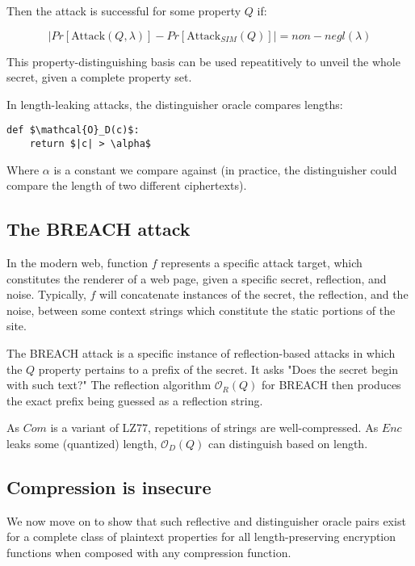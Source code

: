 \documentclass{article}
\begin{document}
Then the attack is successful for some property $Q$ if:

\begin{equation*}
    |Pr[\text{Attack}(Q, \lambda)] - Pr[\text{Attack}_{SIM}(Q)]| = non-negl(\lambda)
\end{equation*}

This property-distinguishing basis can be used repeatitively to unveil the
whole secret, given a complete property set.

In length-leaking attacks, the distinguisher oracle compares lengths:

\begin{lstlisting}[texcl,mathescape]
def $\mathcal{O}_D(c)$:
    return $|c| > \alpha$
\end{lstlisting}

Where $\alpha$ is a constant we compare against (in practice, the distinguisher
could compare the length of two different ciphertexts).

\subsection*{The BREACH attack}

In the modern web, function $f$ represents a specific attack target, which
constitutes the renderer of a web page, given a specific secret, reflection,
and noise. Typically, $f$ will concatenate instances of the secret, the
reflection, and the noise, between some context strings which constitute the
static portions of the site.

The BREACH attack is a specific instance of reflection-based attacks in which
the $Q$ property pertains to a prefix of the secret. It asks "Does the secret
begin with such text?" The reflection algorithm $\mathcal{O}_R(Q)$ for BREACH
then produces the exact prefix being guessed as a reflection string.

As $Com$ is a variant of LZ77, repetitions of strings are well-compressed. As
$Enc$ leaks some (quantized) length, $\mathcal{O}_D(Q)$ can distinguish based
on length.

\subsection*{Compression is insecure}

We now move on to show that such reflective and distinguisher oracle pairs
exist for a complete class of plaintext properties for all length-preserving
encryption functions when composed with any compression function.
\end{document}
